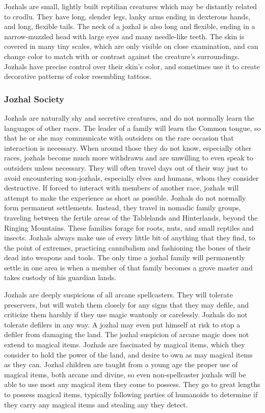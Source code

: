 
Jozhals are small, lightly built reptilian creatures which may be distantly related to crodlu. They have long, slender legs, lanky arms ending in dexterous hands, and long, flexible tails. The neck of a jozhal is also long and flexible, ending in a narrow-muzzled head with large eyes and many needle-like teeth. The skin is covered in many tiny scales, which are only visible on close examination, and can change color to match with or contrast against the creature's surroundings. Jozhals have precise control over their skin's color, and sometimes use it to create decorative patterns of color resembling tattoos.

\subsubsection{Jozhal Society}
Jozhals are naturally shy and secretive creatures, and do not normally learn the languages of other races. The leader of a family will learn the Common tongue, so that he or she may communicate with outsiders on the rare occasion that interaction is necessary. When around those they do not know, especially other races, jozhals become much more withdrawn and are unwilling to even speak to outsiders unless necessary. They will often travel days out of their way just to avoid encountering non-jozhals, especially elves and humans, whom they consider destructive. If forced to interact with members of another race, jozhals will attempt to make the experience as short as possible. Jozhals do not normally form permanent settlements. Instead, they travel in nomadic family groups, traveling between the fertile areas of the Tablelands and Hinterlands, beyond the Ringing Mountains. These families forage for roots, nuts, and small reptiles and insects. Jozhals always make use of every little bit of anything that they find, to the point of extremes, practicing cannibalism and fashioning the bones of their dead into weapons and tools. The only time a jozhal family will permanently settle in one area is when a member of that family becomes a grove master and takes custody of his guardian lands.

Jozhals are deeply suspicious of all arcane spellcasters. They will tolerate preservers, but will watch them closely for any signs that they may defile, and criticize them harshly if they use magic wantonly or carelessly. Jozhals do not tolerate defilers in any way. A jozhal may even put himself at risk to stop a defiler from damaging the land. The jozhal suspicion of arcane magic does not extend to magical items. Jozhals are fascinated by magical items, which they consider to hold the power of the land, and desire to own as may magical items as they can. Jozhal children are taught from a young age the proper use of magical items, both arcane and divine, so even non-spellcaster jozhals will be able to use most any magical item they come to possess. They go to great lengths to possess magical items, typically following parties of humanoids to determine if they carry any magical items and stealing any they detect.

